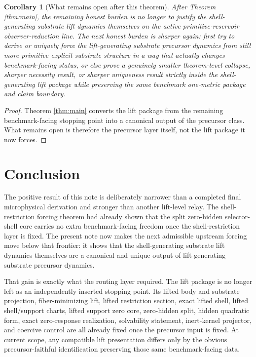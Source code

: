 \documentclass[11pt]{article}
\newtheorem{corollary}{Corollary}
\begin{document}
\begin{corollary}[What remains open after this theorem]
\label{cor:next}
After Theorem \ref{thm:main}, the remaining honest burden is no longer to justify the shell-generating substrate lift dynamics themselves on the active primitive-reservoir observer-reduction line. The next honest burden is sharper again: first try to derive or uniquely force the lift-generating substrate precursor dynamics from still more primitive explicit substrate structure in a way that actually changes benchmark-facing status, or else prove a genuinely smaller theorem-level collapse, sharper necessity result, or sharper uniqueness result strictly inside the shell-generating lift package while preserving the same benchmark one-metric package and claim boundary.
\end{corollary}

\begin{proof}
Theorem \ref{thm:main} converts the lift package from the remaining benchmark-facing stopping point into a canonical output of the precursor class. What remains open is therefore the precursor layer itself, not the lift package it now forces.
\end{proof}

\section{Conclusion}

The positive result of this note is deliberately narrower than a completed final microphysical derivation and stronger than another lift-level relay. The shell-restriction forcing theorem had already shown that the split zero-hidden selector-shell core carries no extra benchmark-facing freedom once the shell-restriction layer is fixed. The present note now makes the next admissible upstream forcing move below that frontier: it shows that the shell-generating substrate lift dynamics themselves are a canonical and unique output of lift-generating substrate precursor dynamics.

That gain is exactly what the routing layer required. The lift package is no longer left as an independently inserted stopping point. Its lifted body and substrate projection, fiber-minimizing lift, lifted restriction section, exact lifted shell, lifted shell/support charts, lifted support zero core, zero-hidden split, hidden quadratic form, exact zero-response realization, solvability statement, inert-kernel projector, and coercive control are all already fixed once the precursor input is fixed. At current scope, any compatible lift presentation differs only by the obvious precursor-faithful identification preserving those same benchmark-facing data.
\end{document}
